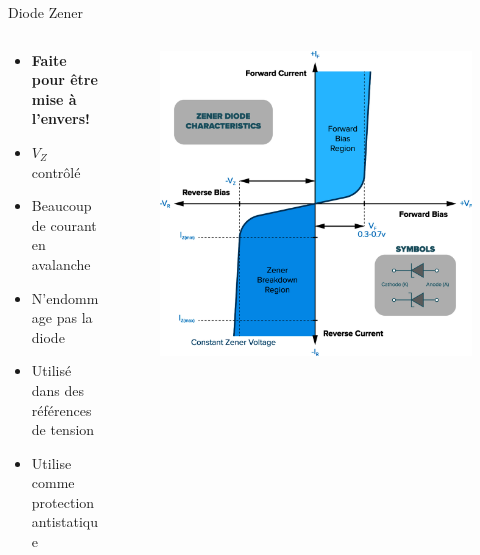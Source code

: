 \begin{frame}{Diode Zener}
    \begin{columns}
        \begin{column}{0.4\textwidth}
            \begin{itemize}
                \item \textbf{Faite pour être mise à l'envers!}
                \bigskip
                \item $V_Z$ contrôlé
                \item Beaucoup de courant en avalanche
                \item N'endommage pas la diode
                \bigskip
                \item Utilisé dans des références de tension
                \item Utilise comme protection antistatique
            \end{itemize}
        \end{column}
        \begin{column}{0.6\textwidth}
            \begin{figure}
                \centering
                \includegraphics[width=\textwidth, height=0.8\textheight, keepaspectratio]{pictures/diode-zener-iv-curve.png}
            \end{figure}
        \end{column}
    \end{columns}
\end{frame}

